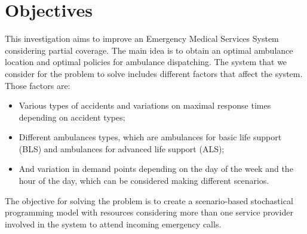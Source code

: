 

\section{Objectives}
This investigation aims to improve an Emergency Medical Services System con\-si\-de\-ring partial coverage. The main idea is to obtain an optimal ambulance location and optimal policies for ambulance dispatching. The system that we consider for the problem to solve includes different factors that affect the system. Those factors are:
\begin{itemize}

\item Various types of accidents and variations on maximal response times depending on accident types; 

\item Different ambulances types, which are ambulances for basic life support (BLS) and ambulances for advanced life support (ALS);

\item And variation in demand points depending on the day of the week and the hour of the day, which can be considered making different scenarios.


\end{itemize} 

The objective for solving the problem is to create a scenario-based stochastical programming model with resources considering more than one service provider in\-vol\-ved in the system to attend incoming emergency calls. 


